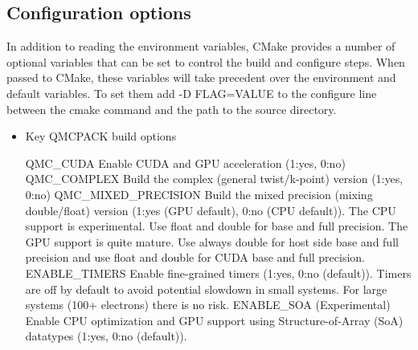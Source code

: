 \subsection{Configuration options}
\label{sec:cmakeoptions}
In addition to reading the environment variables, CMake provides a
number of optional variables that can be set to control the build and
configure steps.  When passed to CMake, these variables will take
precedent over the environment and default variables.  To set them
add -D FLAG=VALUE to the configure line between the cmake command and
the path to the source directory.

\begin{itemize}
\item  Key QMCPACK build options
%
\begin{shade}
QMC_CUDA              Enable CUDA and GPU acceleration (1:yes, 0:no)
QMC_COMPLEX           Build the complex (general twist/k-point) version (1:yes, 0:no)
QMC_MIXED_PRECISION   Build the mixed precision (mixing double/float) version
                      (1:yes (GPU default), 0:no (CPU default)).
                      The CPU support is experimental.
                      Use float and double for base and full precision.
                      The GPU support is quite mature.
                      Use always double for host side base and full precision
                      and use float and double for CUDA base and full precision.
ENABLE_TIMERS         Enable fine-grained timers (1:yes, 0:no (default)).
                      Timers are off by default to avoid potential slowdown in small
                      systems. For large systems (100+ electrons) there is no risk.
ENABLE_SOA            (Experimental) Enable CPU optimization and GPU support using
                      Structure-of-Array (SoA) datatypes (1:yes, 0:no (default)).
\end{shade}


\end{itemize}

